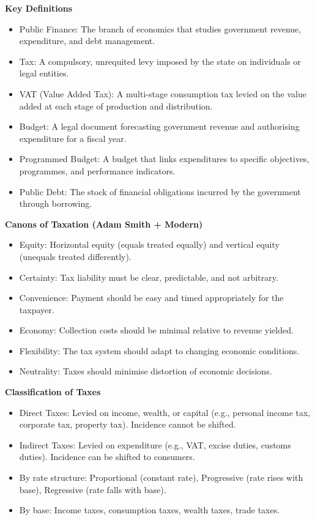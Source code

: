 \documentclass[11pt]{article}
\newcommand{\cle}[1]{{\popxbold\color{popdark}#1}}
\begin{document}
\begin{bilan}
\textbf{Key Definitions}
\begin{itemize}
\item \cle{Public Finance}: The branch of economics that studies government revenue, expenditure, and debt management.
\item \cle{Tax}: A compulsory, unrequited levy imposed by the state on individuals or legal entities.
\item \cle{VAT (Value Added Tax)}: A multi-stage consumption tax levied on the value added at each stage of production and distribution.
\item \cle{Budget}: A legal document forecasting government revenue and authorising expenditure for a fiscal year.
\item \cle{Programmed Budget}: A budget that links expenditures to specific objectives, programmes, and performance indicators.
\item \cle{Public Debt}: The stock of financial obligations incurred by the government through borrowing.
\end{itemize}

\textbf{Canons of Taxation (Adam Smith + Modern)}
\begin{itemize}
\item \cle{Equity}: Horizontal equity (equals treated equally) and vertical equity (unequals treated differently).
\item \cle{Certainty}: Tax liability must be clear, predictable, and not arbitrary.
\item \cle{Convenience}: Payment should be easy and timed appropriately for the taxpayer.
\item \cle{Economy}: Collection costs should be minimal relative to revenue yielded.
\item \cle{Flexibility}: The tax system should adapt to changing economic conditions.
\item \cle{Neutrality}: Taxes should minimise distortion of economic decisions.
\end{itemize}

\textbf{Classification of Taxes}
\begin{itemize}
\item \cle{Direct Taxes}: Levied on income, wealth, or capital (e.g., personal income tax, corporate tax, property tax). Incidence cannot be shifted.
\item \cle{Indirect Taxes}: Levied on expenditure (e.g., VAT, excise duties, customs duties). Incidence can be shifted to consumers.
\item \cle{By rate structure}: \cle{Proportional} (constant rate), \cle{Progressive} (rate rises with base), \cle{Regressive} (rate falls with base).
\item \cle{By base}: Income taxes, consumption taxes, wealth taxes, trade taxes.
\end{itemize}


\end{bilan}
\end{document}
